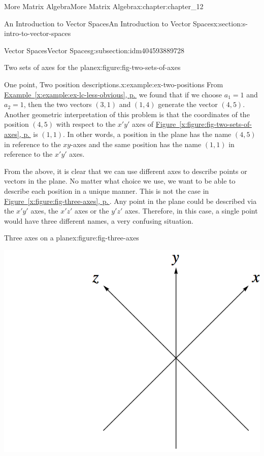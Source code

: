 \documentclass[twoside,10pt,]{book}
\newcommand{\xreffont}{\relax}
\numberwithin{equation}{section}
\begin{document}
\begin{chapterptx}{More Matrix Algebra}{}{More Matrix Algebra}{}{}{x:chapter:chapter_12}
\begin{sectionptx}{An Introduction to Vector Spaces}{}{An Introduction to Vector Spaces}{}{}{x:section:s-intro-to-vector-spaces}
\begin{subsectionptx}{Vector Spaces}{}{Vector Spaces}{}{}{g:subsection:idm404593889728}
\begin{figureptx}{Two sets of axes for the plane}{x:figure:fig-two-sets-of-axes}{}
\begin{image}{0.15}{0.7}{0.15}
\end{image}%
\tcblower
\end{figureptx}%
\begin{example}{One point, Two position descriptions.}{x:example:ex-two-positions}%
From \hyperref[x:example:ex-lc-less-obvious]{Example~{\xreffont\ref{x:example:ex-lc-less-obvious}}, p.\,\pageref{x:example:ex-lc-less-obvious}} we found that if we choose \(a_1=1\) and \(a_2=1\), then the two vectors \((3, 1)\) and \((1,4)\) generate the vector \((4,5)\). Another geometric interpretation of this problem is that the coordinates of the position \((4,5)\) with respect to the \(x'y'\) axes of \hyperref[x:figure:fig-two-sets-of-axes]{Figure~{\xreffont\ref{x:figure:fig-two-sets-of-axes}}, p.\,\pageref{x:figure:fig-two-sets-of-axes}} is \((1, 1)\). In other words, a position in the plane has the name \((4,5)\) in reference to the \(xy\)-axes and the same position has the name \((1, 1)\) in reference to the \(x'y'\) axes.%
\par
From the above, it is clear that we can use different axes to describe points or vectors in the plane. No matter what choice we use, we want to be able to describe each position in a unique manner. This is not the case in \hyperref[x:figure:fig-three-axes]{Figure~{\xreffont\ref{x:figure:fig-three-axes}}, p.\,\pageref{x:figure:fig-three-axes}}. Any point in the plane could be described via the \(x'y'\) axes, the \(x'z'\) axes or the \(y'z'\) axes. Therefore, in this case, a single point would have three different names, a very confusing situation.%
\begin{figureptx}{Three axes on a plane}{x:figure:fig-three-axes}{}%
\begin{image}{0.25}{0.5}{0.25}%
\includegraphics[width=\linewidth]{images/fig-three-axes.png}

\end{image}
\end{figureptx}
\end{example}
\end{subsectionptx}
\end{sectionptx}
\end{chapterptx}
\end{document}
